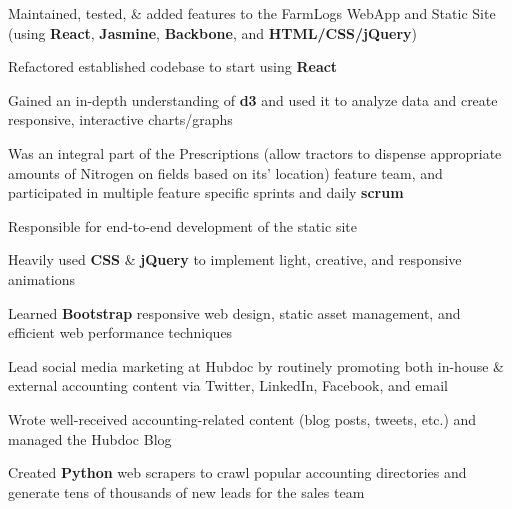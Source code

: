\documentclass[letterpaper]{deedy-resume} %
\begin{document}
\begin{minipage}[t]{0.66\textwidth}

  \begin{tightitemize}
  \item Maintained, tested, \& added features to the FarmLogs WebApp and Static Site (using \textbf{React}, \textbf{Jasmine}, \textbf{Backbone}, and \textbf{HTML/CSS/jQuery})
  \item Refactored established codebase to start using \textbf{React}
  \item Gained an in-depth understanding of \textbf{d3} and used it to analyze data and create responsive, interactive charts/graphs
  \item Was an integral part of the Prescriptions (allow tractors to dispense appropriate amounts of Nitrogen on fields based on its' location) feature team, and participated in multiple feature specific sprints and daily \textbf{scrum}
  \end{tightitemize}

  \sectionspace %



  \begin{tightitemize}
  \item Responsible for end-to-end development of the static site
  \item Heavily used \textbf{CSS} \& \textbf{jQuery} to implement light, creative, and responsive animations
  \item Learned \textbf{Bootstrap} responsive web design, static asset management, and efficient web performance techniques
  \item Lead social media marketing at Hubdoc by routinely promoting both in-house \& external accounting content via Twitter, LinkedIn, Facebook, and email
  \item Wrote well-received accounting-related content (blog posts, tweets, etc.) and managed the Hubdoc Blog
  \item Created \textbf{Python} web scrapers to crawl popular accounting directories and generate tens of thousands of new leads for the sales team
  \end{tightitemize}

  \sectionspace %
  

\end{minipage}
\end{document}
